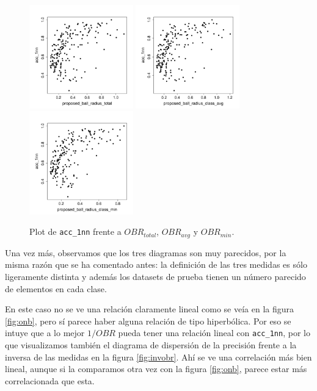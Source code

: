 \documentclass[a4paper,12pt]{report}
\theoremstyle{definition}
\begin{document}
\begin{figure}[H]
  \centering
  \includegraphics[width=0.4\textwidth]{plots/proposed/1nn_vs_proposed_ball_radius_total}
  \includegraphics[width=0.4\textwidth]{plots/proposed/1nn_vs_proposed_ball_radius_class_avg}
  \includegraphics[width=0.4\textwidth]{plots/proposed/1nn_vs_proposed_ball_radius_class_min}
  \caption{Plot de \texttt{acc\_1nn} frente a $OBR_{total}$, $OBR_{avg}$ y $OBR_{min}$.}
  \label{fig:obr}
\end{figure}

Una vez más, observamos que los tres diagramas son muy parecidos, por la misma razón que se ha comentado antes: la definición de las tres medidas es sólo ligeramente distinta y además los datasets de prueba tienen un número parecido de elementos en cada clase.

En este caso no se ve una relación claramente lineal como se veía en la figura \ref{fig:onb}, pero sí parece haber alguna relación de tipo hiperbólica. Por eso se intuye que a lo mejor $1/OBR$ pueda tener una relación lineal con \texttt{acc\_1nn}, por lo que visualizamos también el diagrama de dispersión de la precisión frente a la inversa de las medidas en la figura \ref{fig:invobr}. Ahí se ve una correlación más bien lineal, aunque si la comparamos otra vez con la figura \ref{fig:onb}, parece estar más correlacionada que esta.
\end{document}
